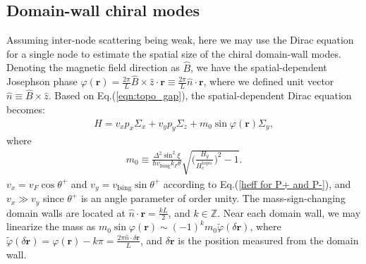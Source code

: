 \begin{subappendices}
\section{Domain-wall chiral modes}\label{app:domain_wall_modes}
	Assuming inter-node scattering being weak, here we may use the Dirac equation for a single node to estimate the spatial size of the chiral domain-wall modes. Denoting the magnetic field direction as $\hat B$, we have the spatial-dependent Josephson phase $\varphi(\bm r)=\frac{2\pi}{L}\hat B\times\hat z  \cdot \bm r\equiv \frac{2\pi}{L}\hat n\cdot \bm r$, where we defined unit vector $\hat n\equiv \hat B\times \hat z$. Based on Eq.(\ref{eqn:topo_gap}), the spatial-dependent Dirac equation becomes:
	\begin{align}
		H=v_x p_x\Sigma_x+v_y p_y\Sigma_z+m_0\sin\varphi(\bm r)\Sigma_y,
	\end{align}
	where
	\begin{align}
		m_0\equiv\frac{\Delta^2\sin^2\xi}{\hbar v_{\text{Ising}}k_F\theta}\sqrt{\Big(\frac{H_y}{H^{\text{topo.}}_{c}}\Big)^2-1}.
	\end{align}
	$v_x=v_F\cos\theta^+$ and $v_y=v_{\text{Ising}}\sin\theta^+$ according to Eq.(\ref{heff for P+ and P-}), and $v_x\gg v_y$ since $\theta^+$ is an angle parameter of order unity. 
	The mass-sign-changing domain walls are located at $\hat n\cdot \bm r=\frac{k L}{2}$, and $k\in\mathbb{Z}$. Near each domain wall, we may linearize the mass as $m_0\sin\varphi(\bm r)\sim (-1)^k m_0\tilde \varphi(\delta \bm r)$, where $\tilde\varphi(\delta \bm r)=\varphi(\bm r)-k\pi=\frac{2\pi\hat n\cdot \delta\bm r}{L}$, and $\delta \bm r$ is the position measured from the domain wall.


\end{subappendices}
